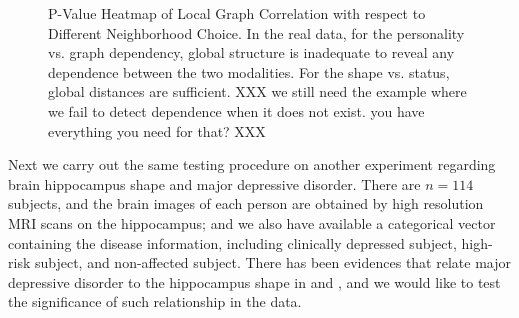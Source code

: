 \documentclass[11pt]{article}
\begin{document}
\begin{figure}[htbp]
\centering
{}
\hfil
\centering
{}
\hfil
\centering
{}
\caption{P-Value Heatmap of Local Graph Correlation with respect to Different Neighborhood Choice.  In the real data, for the personality vs. graph dependency, global structure is inadequate to reveal any dependence between the two modalities.  For the shape vs. status,  global distances are sufficient.  XXX we still need the example where we fail to detect dependence when it does not exist.  you have everything you need for that? XXX}
\label{figReal}
\end{figure}

Next we carry out the same testing procedure on another experiment regarding brain hippocampus shape and major depressive disorder. There are $n=114$ subjects, and the brain images of each person are obtained by  high resolution MRI scans on the hippocampus; and we also have available a categorical vector containing the disease information, including clinically depressed subject, high-risk subject, and non-affected subject. There has been evidences that relate major depressive disorder to the hippocampus shape in \cite{ParkEtAl2011} and \cite{PosenerEtAl2003}, and we would like to test the significance of such relationship in the data. 
\end{document}

